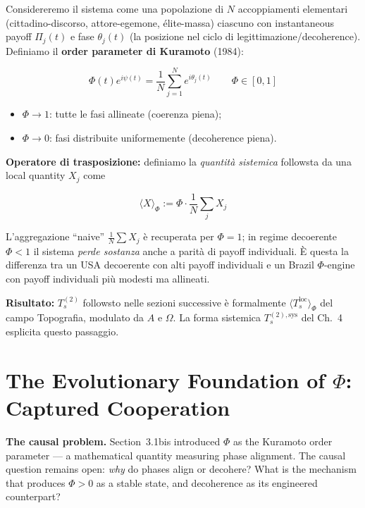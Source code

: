 \Hypoth{} Considereremo il sistema come una popolazione di \(N\)
accoppiamenti elementari (cittadino-discorso, attore-egemone,
élite-massa) ciascuno con instantaneous payoff \(\Pi_j(t)\) e fase
\(\theta_j(t)\) (la posizione nel ciclo di legittimazione/decoherence).
Definiamo il \textbf{order parameter di Kuramoto} (1984):

\[
\Phi(t) e^{i\psi(t)} = \frac{1}{N}\sum_{j=1}^{N} e^{i\theta_j(t)} \qquad \Phi \in [0, 1]
\]

\begin{itemize}
\tightlist
\item
  \(\Phi \to 1\): tutte le fasi allineate (coerenza piena);
\item
  \(\Phi \to 0\): fasi distribuite uniformemente (decoherence piena).
\end{itemize}

\Hypoth{} \textbf{Operatore di trasposizione:} definiamo la
\emph{quantità sistemica} followsta da una local quantity \(X_j\) come

\[
\langle X \rangle_\Phi := \Phi \cdot \frac{1}{N}\sum_j X_j
\]

L'aggregazione ``naive'' \(\frac{1}{N}\sum X_j\) è recuperata per
\(\Phi = 1\); in regime decoerente \(\Phi < 1\) il sistema \emph{perde
sostanza} anche a parità di payoff individuali. È questa la differenza
tra un USA decoerente con alti payoff individuali e un Brazil
\(\Phi\)-engine con payoff individuali più modesti ma allineati.

\Proved{} \textbf{Risultato:} \(T_s^{(2)}\) followsto nelle sezioni
successive è formalmente \(\langle T_s^{\text{loc}}\rangle_\Phi\) del
campo Topografia, modulato da \(A\) e \(\Omega\). La forma sistemica
\(T_s^{(2),\text{sys}}\) del Ch.~4 esplicita questo passaggio.



\section{\texorpdfstring{The Evolutionary Foundation of \(\Phi\): Captured Cooperation}{The Evolutionary Foundation of Phi: Captured Cooperation}}\label{il-fondamento-evolutivo-di-phi}

\Hypoth{} \textbf{The causal problem.} Section~3.1bis introduced
\(\Phi\) as the Kuramoto order parameter --- a mathematical quantity
measuring phase alignment. The causal question remains open:
\emph{why} do phases align or decohere? What is the mechanism that
produces \(\Phi > 0\) as a stable state, and decoherence as its
engineered counterpart?

